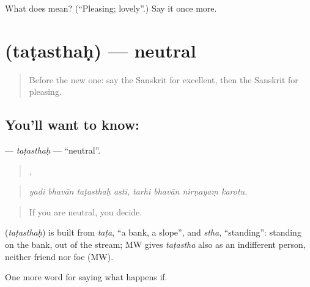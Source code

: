 \begin{tcolorbox}[breakable,colback=teal!4,colframe=teal!35!black,title={Before you move on}]
What does  mean? (\textquotedblleft{}Pleasing; lovely\textquotedblright{}.) Say it once more.
\end{tcolorbox}
\section[\texorpdfstring{\sk{तटस्थः} (taṭasthaḥ)}{तटस्थः (taṭasthaḥ)}]{ (taṭasthaḥ) — neutral}

\label{lesson:SA-C542-tatasthah}



\begin{quote}
Before the new one: say the Sanskrit for excellent, then the Sanskrit for pleasing.
\end{quote}

\subsection*{You'll want to know: }
\textbf{} — \emph{taṭasthaḥ} — \textquotedblleft{}neutral\textquotedblright{}.

\begin{quote}
   ,    
\end{quote}

\begin{quote}
\emph{yadi bhavān taṭasthaḥ asti, tarhi bhavān nirṇayaṃ karotu.}
\end{quote}

\begin{quote}
If you are neutral, you decide.
\end{quote}

\begin{cousinweb}
\textbf{} (\emph{taṭasthaḥ}) is built from \emph{taṭa}, \textquotedblleft{}a bank, a slope\textquotedblright{}, and \emph{stha}, \textquotedblleft{}standing\textquotedblright{}: standing on the bank, out of the stream; MW gives \emph{taṭastha} also as an indifferent person, neither friend nor foe (MW).
\end{cousinweb}

\begin{grammarlens}[title={What you've built}]
One more word for saying what happens if.
\end{grammarlens}

